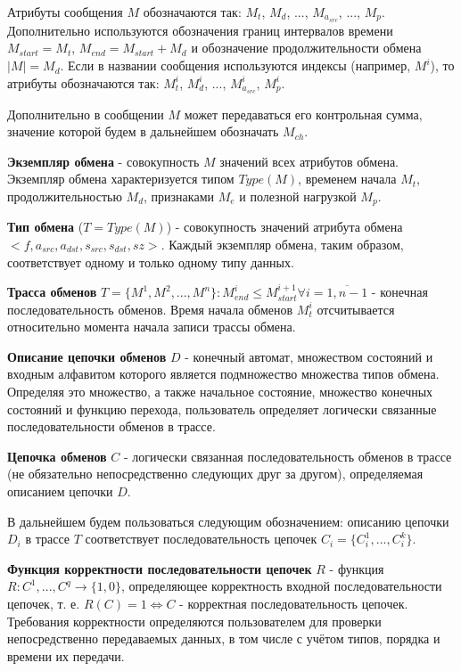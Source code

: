 Атрибуты сообщения $M$ обозначаются так: $M_t$, $M_d$, ..., $M_{a_{src}}$, ..., 
$M_p$. Дополнительно используются обозначения границ интервалов времени 
$M_{start} = M_t$, $M_{end} = M_{start} + M_d$ и обозначение продолжительности 
обмена $|M| = M_d$. Если в названии сообщения используются индексы (например, 
$M^i$), то атрибуты обозначаются так: $M^i_t$, $M^i_d$, ..., 
$M^i_{a_{src}}$, $M^i_p$.



Дополнительно в сообщении $M$ может передаваться его контрольная сумма, 
значение которой будем в дальнейшем обозначать $M_{ch}$.

\textbf{Экземпляр обмена} - совокупность $M$ значений всех атрибутов обмена. 
Экземпляр обмена характеризуется типом $Type(M)$, временем начала $M_t$, 
продолжительностью $M_d$, признаками $M_e$ и полезной нагрузкой $M_p$.

\textbf{Тип обмена} ($T = Type(M)$) - совокупность значений атрибута обмена 
$<f, a_{src}, a_{dst}, s_{src}, s_{dst}, sz>$. Каждый экземпляр обмена, таким 
образом, соответствует одному и только одному типу данных.

\textbf{Трасса обменов} $T = \{  M^1, M^2, ..., M^n \} : M^i_{end} \leq 
M^{i+1}_{start} \forall i = \overline{1,n-1}$ - конечная последовательность 
обменов. Время начала обменов $M^i_t$ отсчитывается относительно момента начала 
записи трассы обмена.


\textbf{Описание цепочки обменов} $D$ - конечный автомат, множеством состояний 
и входным алфавитом которого является подмножество множества типов обмена. 
Определяя это множество, а также начальное состояние, множество конечных 
состояний и функцию перехода, пользователь определяет логически связанные 
последовательности обменов в трассе.

\textbf{Цепочка обменов} $C$ - логически связанная последовательность обменов 
в трассе (не обязательно непосредственно следующих друг за другом), 
определяемая описанием цепочки $D$.

В дальнейшем будем пользоваться следующим обозначением: описанию цепочки $D_i$ 
в трассе $T$ соответствует последовательность цепочек $C_i = \{ C_i^1, ..., 
C_i^k \}$.


\textbf{Функция корректности последовательности цепочек} $R$ - функция $R: 
{C^1, ..., C^q} \rightarrow \{ 1, 0 \}$, определяющее корректность входной 
последовательности цепочек, т. е. $R(C) = 1 \Leftrightarrow C$ - корректная 
последовательность цепочек. Требования корректности определяются пользователем 
для проверки непосредственно передаваемых данных, в том числе с учётом 
типов, порядка и времени их передачи.

